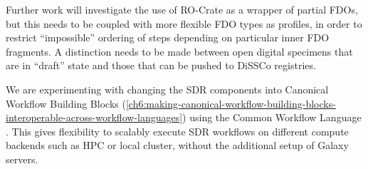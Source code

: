 Further work will investigate the use of RO-Crate as a wrapper of
partial FDOs, but this needs to be coupled with more flexible FDO types
as profiles, in order to restrict ``impossible'' ordering of steps
depending on particular inner FDO fragments. A distinction needs to be
made between open digital specimens that are in ``draft'' state and
those that can be pushed to DiSSCo registries.

We are experimenting with changing the SDR components into Canonical
Workflow Building Blocks \cite{Soiland-Reyes 2022a}
(\vref{ch6:making-canonical-workflow-building-blocks-interoperable-across-workflow-languages}) 
using the Common Workflow Language \cite{Crusoe 2022}. This gives
flexibility to scalably execute SDR workflows on different compute
backends such as HPC or local cluster, without the additional setup of
Galaxy servers.

